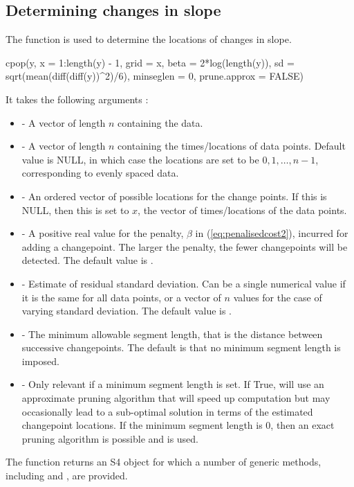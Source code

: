 \documentclass[article]{jss}
\begin{document}
\subsection{Determining changes in slope}
%
%
The function  is used to determine the locations of changes in slope.
%
%
\begin{CodeInput}
cpop(y, x = 1:length(y) - 1, grid = x, beta = 2*log(length(y)), 
    sd =  sqrt(mean(diff(diff(y))^2)/6), minseglen = 0, 
    prune.approx = FALSE)
\end{CodeInput}
It takes the following arguments :
%
%
\begin{itemize}
 \item  {} - A vector of length $n$ containing the data.
\item {} -  A vector of length $n$ containing the times/locations of data points. Default value is NULL, in which case the locations are set to be $0,1,\ldots,n-1$, corresponding to evenly spaced data.
\item {} -  An ordered vector of possible locations for the change points. If this is NULL, then this is set to $x$, the vector of times/locations of the data points.
\item {} -  A positive real value for the penalty, $\beta$ in (\ref{eq:penalisedcost2}), incurred for adding a changepoint. The larger the penalty, the fewer changepoints will be detected. The default value is .
\item {} - Estimate of residual standard deviation. Can be a single numerical value if it is the same for all data points, or a vector of $n$ values for the case of varying standard deviation. The default value is .
\item {} -  The minimum allowable segment length, that is the distance between successive changepoints. The default is that no minimum segment length is imposed.
\item {} -  Only relevant if a minimum segment length is set. If True,  will use an approximate pruning algorithm that will speed up computation but may occasionally lead to a sub-optimal solution in terms of the estimated changepoint locations. If the minimum segment length is 0, then an exact pruning algorithm is possible and is used.
\end{itemize}
The  function returns an S4 object for which a number of generic methods, including  and , are provided. 
\end{document}
